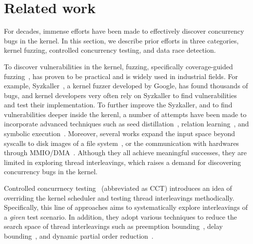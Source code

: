 \section{Related work}
\label{s:relwk}

For decades, immense efforts have been made to effectively discover
concurrency bugs in the kernel. In this section, we describe prior
efforts in three categories, kernel fuzzing, controlled concurrency
testing, and data race detection.


%
To discover vulnerabilities in the kernel, fuzzing, specifically
coverage-guided fuzzing~\cite{syzkaller, moonshine, healer, hfl, imf,
  janus, hydra, trinity, kafl, periscope, syzvegas, ksg}, has proven
to be practical and is widely used in industrial fields.
%
For example, Syzkaller~\cite{syzkaller}, a kernel fuzzer developed by
Google, has found thousands of bugs, and kernel developers very often
rely on Syzkaller to find vulnerabilities and test their
implementation.
%
To further improve the Syzkaller, and to find vulnerabilities deeper
inside the kerenl, a number of attempts have been made to incorporate
advanced techniques such as seed distillation~\cite{moonshine},
relation learning~\cite{healer}, and symbolic execution~\cite{hfl}.
%
Moreover, several works expand the input space beyond syscalls to disk
images of a file system~\cite{janus, hydra}, or the communication with
hardwares through MMIO/DMA~\cite{periscope}.
%
Although they all achieve meaningful successes, they are limited in
exploring thread interleavings, which raises a demand for discovering
concurrency bugs in the kernel.







%
Controlled concurrnecy testing~\cite{ski, pctalgorithm, sparsernr,
  chess, nagarakatte2012multicore, abdelrasoul2017promoting,
  cai2016radius, mukherjee2020learning, schedulebounding} (abbreviated
as CCT) introduces an idea of overriding the kernel scheduler and
testing thread interleavings methodically.
%
Specifically, this line of approaches aims to systematically explore
interleavings of a \textit{given} test scenario.
%
In addition, they adopt various techniques to reduce the search space
of thread interleavings such as preemption
bounding~\cite{pctalgorithm, ski}, delay
bounding~\cite{delaybounding}, and dynamic partial order
reduction~\cite{dpor1, dpor2, dpor3}.



